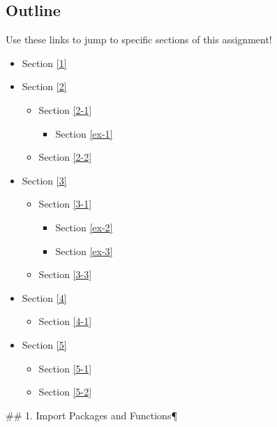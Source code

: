 \documentclass[11pt]{article}
\providecommand{\tightlist}{%
      \setlength{\itemsep}{0pt}\setlength{\parskip}{0pt}}
\begin{document}
    \hypertarget{outline}{%
\subsection{Outline}\label{outline}}

Use these links to jump to specific sections of this assignment!

\begin{itemize}
\tightlist
\item
  Section \ref{1}
\item
  Section \ref{2}

  \begin{itemize}
  \tightlist
  \item
    Section \ref{2-1}

    \begin{itemize}
    \tightlist
    \item
      Section \ref{ex-1}
    \end{itemize}
  \item
    Section \ref{2-2}
  \end{itemize}
\item
  Section \ref{3}

  \begin{itemize}
  \tightlist
  \item
    Section \ref{3-1}

    \begin{itemize}
    \tightlist
    \item
      Section \ref{ex-2}
    \item
      Section \ref{ex-3}
    \end{itemize}
  \item
    Section \ref{3-3}
  \end{itemize}
\item
  Section \ref{4}

  \begin{itemize}
  \tightlist
  \item
    Section \ref{4-1}
  \end{itemize}
\item
  Section \ref{5}

  \begin{itemize}
  \tightlist
  \item
    Section \ref{5-1}
  \item
    Section \ref{5-2}
  \end{itemize}
\end{itemize}

     \#\# 1. Import Packages and Functions¶
\end{document}
